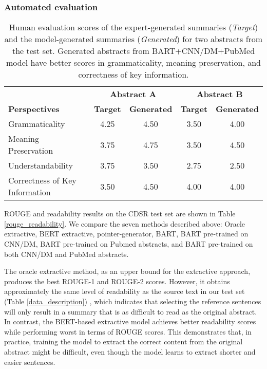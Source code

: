 \documentclass[letterpaper, table]{article} %
\begin{document}
\subsubsection{Automated evaluation}



\begin{table*}
\centering
\begin{tabular}{@{} l cc cc @{}}
\toprule
& \multicolumn{2}{c}{\textbf{Abstract A}} & \multicolumn{2}{c}{\textbf{Abstract B}} \\
\cmidrule(lr){2-3}
\cmidrule(lr){4-5}
\textbf{Perspectives} & \textbf{Target}  & \textbf{Generated} & \textbf{Target}  & \textbf{Generated} \\
\midrule
Grammaticality            & 4.25    & 4.50        &3.50     & 4.00 \\
Meaning Preservation       & 3.75    & 4.75       & 3.50     & 4.50 \\
Understandability  & 3.75    & 3.50        & 2.75    & 2.50     \\
Correctness of Key Information        & 3.50     & 4.50    & 4.00       & 4.00 \\
\bottomrule
\end{tabular}
\caption{Human evaluation scores of the expert-generated summaries (\textit{Target}) and the model-generated summaries (\textit{Generated}) for two abstracts from the test set. Generated abstracts from BART+CNN/DM+PubMed model have better scores in grammaticality, meaning preservation, and correctness of key information.}
\label{result_human_evaluation}

\end{table*}
ROUGE and readability results on the CDSR test set are shown in Table \ref{rouge_readability}. We compare the seven methods described above: Oracle extractive, BERT extractive, pointer-generator, BART, BART pre-trained on CNN/DM, BART pre-trained on Pubmed abstracts, and BART pre-trained on both CNN/DM and PubMed abstracts.

The oracle extractive method, as an upper bound for the extractive approach, produces the best ROUGE-1 and ROUGE-2 scores. However, it obtains approximately the same level of readability as the source text in our test set (Table \ref{data_description})
, which indicates that selecting the reference sentences will only result in a summary that is as difficult to read as the original abstract.
In contrast, the BERT-based extractive model achieves better readability scores while performing worst in terms of ROUGE scores. This demonstrates that, in practice, training the model to extract the correct content from the original abstract might be difficult, even though the model learns to extract shorter and easier sentences.
\end{document}
